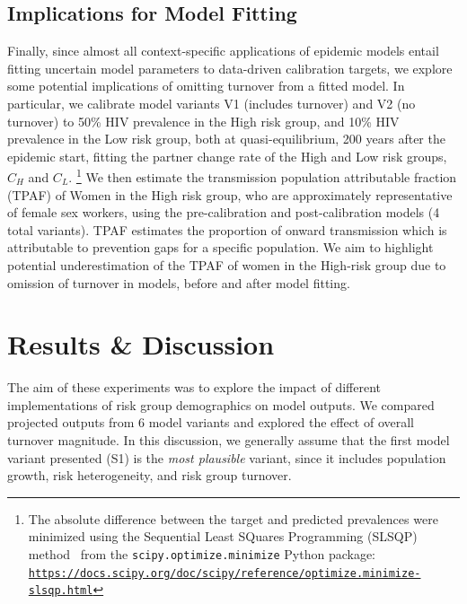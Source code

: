 \documentclass[10pt]{article}
\numberwithin{equation}{section}
\newcommand{\hreftt}[1]{\href{#1}{\texttt{#1}}}
\begin{document}
\subsection{Implications for Model Fitting}\label{ss:exp-zeta-fit}
Finally, since almost all context-specific applications of epidemic models entail
fitting uncertain model parameters to data-driven calibration targets,
we explore some potential implications of omitting turnover from a fitted model.
In particular, we calibrate model variants V1 (includes turnover) and V2 (no turnover) to
50\% HIV prevalence in the High risk group, and
10\% HIV prevalence in the Low risk group,
both at quasi-equilibrium, 200 years after the epidemic start,
fitting the partner change rate of the High and Low risk groups, $C_H$ and $C_L$.%
\footnote{The absolute difference between the target and predicted prevalences
  were minimized using the Sequential Least SQuares Programming (SLSQP) method~\cite{Kraft1988}
  from the \texttt{scipy.optimize.minimize} Python package:\\
  \hreftt{https://docs.scipy.org/doc/scipy/reference/optimize.minimize-slsqp.html}}
We then estimate the transmission population attributable fraction (TPAF) %
of Women in the High risk group, who are approximately representative of female sex workers,
using the pre-calibration and post-calibration models
(4 total variants).
TPAF estimates the proportion of onward transmission which is attributable to
prevention gaps for a specific population.
We aim to highlight potential underestimation of the TPAF of women in the High-risk group
due to omission of turnover in models, before and after model fitting.
\section{Results \& Discussion}\label{s:results+discussion}
The aim of these experiments was to explore the impact of
different implementations of risk group demographics on model outputs.
We compared projected outputs from 6 model variants
and explored the effect of overall turnover magnitude.
In this discussion, we generally assume that
the first model variant presented (S1) is the \textit{most plausible} variant,
since it includes population growth, risk heterogeneity, and risk group turnover.
\end{document}
